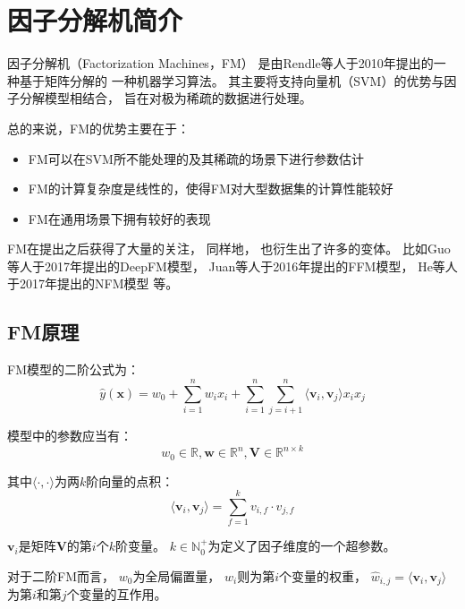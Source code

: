 \section{因子分解机简介}

因子分解机（Factorization Machines，FM）
是由Rendle等人于2010年提出的一种基于矩阵分解的
一种机器学习算法。
其主要将支持向量机（SVM）的优势与因子分解模型相结合，
旨在对极为稀疏的数据进行处理。

总的来说，FM的优势主要在于\cite{rendleFactorizationMachines2010}：
\begin{itemize}
    \item FM可以在SVM所不能处理的及其稀疏的场景下进行参数估计
    \item FM的计算复杂度是线性的，使得FM对大型数据集的计算性能较好
    \item FM在通用场景下拥有较好的表现
\end{itemize}

FM在提出之后获得了大量的关注，
同样地，
也衍生出了许多的变体。
比如Guo等人于2017年提出的DeepFM模型\cite{guoDeepFMFactorizationMachineBased2017}，
Juan等人于2016年提出的FFM模型\cite{juanFieldawareFactorizationMachines2016}，
He等人于2017年提出的NFM模型\cite{heNeuralFactorizationMachines2017}
等。

\subsection{FM原理}

FM模型的二阶公式为：
\begin{equation}
    \hat{y}(\mathbf{x})=w_0+\sum_{i=1}^nw_ix_i+\sum_{i=1}^n\sum_{j=i+1}^n\langle\mathbf{v}_i,\mathbf{v}_j\rangle x_ix_j
\end{equation}

模型中的参数应当有：
\begin{equation}
    w_0\in\mathbb{R}, \mathbf{w}\in\mathbb{R}^n, \mathbf{V}\in\mathbb{R}^{n\times k}
\end{equation}

其中$\langle\cdot,\cdot\rangle$为两$k$阶向量的点积：
\begin{equation}
    \langle\mathbf{v}_i,\mathbf{v}_j\rangle=\sum_{f=1}^kv_{i,f}\cdot v_{j,f}
\end{equation}

$\mathbf{v}_i$是矩阵$\mathbf{V}$的第$i$个$k$阶变量。
$k\in\mathbb{N}_0^+$为定义了因子维度的一个超参数。

对于二阶FM而言，
$w_0$为全局偏置量，
$w_i$则为第$i$个变量的权重，
$\hat{w}_{i,j}=\langle\mathbf{v}_i,\mathbf{v}_j\rangle$
为第$i$和第$j$个变量的互作用。


